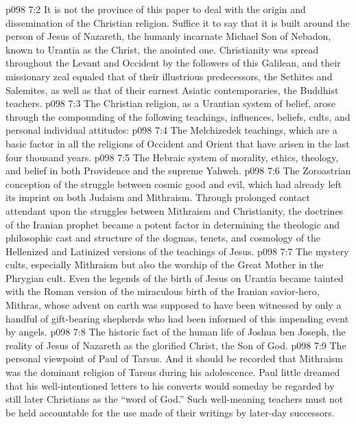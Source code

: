 \vs p098 7:2 It is not the province of this paper to deal with the origin and dissemination of the Christian religion. Suffice it to say that it is built around the person of Jesus of Nazareth, the humanly incarnate Michael Son of Nebadon, known to Urantia as the Christ, the anointed one. Christianity was spread throughout the Levant and Occident by the followers of this Galilean, and their missionary zeal equaled that of their illustrious predecessors, the Sethites and Salemites, as well as that of their earnest Asiatic contemporaries, the Buddhist teachers.
\vs p098 7:3 The Christian religion, as a Urantian system of belief, arose through the compounding of the following teachings, influences, beliefs, cults, and personal individual attitudes:
\vs p098 7:4 \bibnobreakspace The Melchizedek teachings, which are a basic factor in all the religions of Occident and Orient that have arisen in the last four thousand years.
\vs p098 7:5 \pc {}\bibnobreakspace The Hebraic system of morality, ethics, theology, and belief in both Providence and the supreme Yahweh.
\vs p098 7:6 \pc {}\bibnobreakspace The Zoroastrian conception of the struggle between cosmic good and evil, which had already left its imprint on both Judaism and Mithraism. Through prolonged contact attendant upon the struggles between Mithraism and Christianity, the doctrines of the Iranian prophet became a potent factor in determining the theologic and philosophic cast and structure of the dogmas, tenets, and cosmology of the Hellenized and Latinized versions of the teachings of Jesus.
\vs p098 7:7 \pc {}\bibnobreakspace The mystery cults, especially Mithraism but also the worship of the Great Mother in the Phrygian cult. Even the legends of the birth of Jesus on Urantia became tainted with the Roman version of the miraculous birth of the Iranian savior\hyp{}hero, Mithras, whose advent on earth was supposed to have been witnessed by only a handful of gift\hyp{}bearing shepherds who had been informed of this impending event by angels.
\vs p098 7:8 \pc {}\bibnobreakspace The historic fact of the human life of Joshua ben Joseph, the reality of Jesus of Nazareth as the glorified Christ, the Son of God.
\vs p098 7:9 \pc {}\bibnobreakspace The personal viewpoint of Paul of Tarsus. And it should be recorded that Mithraism was the dominant religion of Tarsus during his adolescence. Paul little dreamed that his well\hyp{}intentioned letters to his converts would someday be regarded by still later Christians as the “word of God.” Such well\hyp{}meaning teachers must not be held accountable for the use made of their writings by later\hyp{}day successors.

